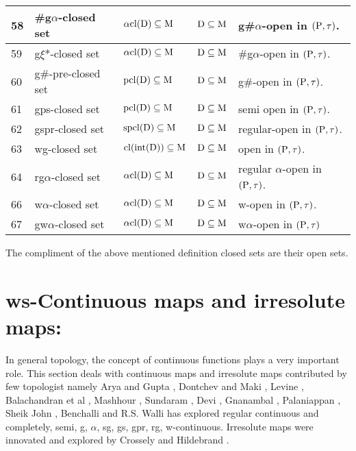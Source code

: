 {\begin{longtable}{|p{1cm}|>{\raggedright}p{5cm}|>{\centering}p{2.5cm}|>{\centering}p{1.7cm}|>{\centering}p{2.8cm}|}
\hline
58 & \#g$\alpha$-closed set\cite{key17} & $\alpha\mathrm{cl}(\mathrm{D}) \subseteq \mathrm{M}$ & $\mathrm{D} \subseteq \mathrm{M}$ & g\#$\alpha$-open in $(\mathrm{P}, \tau)$.\tabularnewline
\hline
59 & g$\xi$*-closed set\cite{key33} & $\alpha\mathrm{cl}(\mathrm{D}) \subseteq \mathrm{M}$ & $\mathrm{D} \subseteq \mathrm{M}$ & \#g$\alpha$-open in $(\mathrm{P}, \tau)$.\tabularnewline
\hline
60 & g\#-pre-closed set\cite{key51} & $\mathrm{pcl}(\mathrm{D}) \subseteq \mathrm{M}$ & $\mathrm{D} \subseteq \mathrm{M}$ & g\#-open in $(\mathrm{P}, \tau)$.\tabularnewline
\hline
61 & gps-closed set\cite{key53} & $\mathrm{pcl}(\mathrm{D}) \subseteq \mathrm{M}$ & $\mathrm{D} \subseteq \mathrm{M}$ & semi open in $(\mathrm{P}, \tau)$.\tabularnewline
\hline
62 & gspr-closed set\cite{key25} & $\mathrm{spcl}(\mathrm{D}) \subseteq \mathrm{M}$ & $\mathrm{D} \subseteq \mathrm{M}$ & regular-open in $(\mathrm{P}, \tau)$.\tabularnewline
\hline
63 & wg-closed set\cite{key42} & $\mathrm{cl}(\mbox{int}(\mathrm{D})) \subseteq \mathrm{M}$ & $\mathrm{D} \subseteq \mathrm{M}$ & open in $(\mathrm{P}, \tau)$.\tabularnewline
\hline
64 & rg$\alpha$-closed set\cite{key63} & $\alpha\mathrm{cl}(\mathrm{D}) \subseteq \mathrm{M}$ & $\mathrm{D} \subseteq \mathrm{M}$ & regular $\alpha$-open in $(\mathrm{P}, \tau)$.\tabularnewline
\hline
66 & w$\alpha$-closed set\cite{key11} & $\alpha\mathrm{cl}(\mathrm{D}) \subseteq \mathrm{M}$ & $\mathrm{D} \subseteq \mathrm{M}$ & w-open in $(\mathrm{P}, \tau)$.\tabularnewline
\hline
67 & gw$\alpha$-closed set\cite{key12} & $\alpha\mathrm{cl}(\mathrm{D}) \subseteq \mathrm{M}$ & $\mathrm{D} \subseteq \mathrm{M}$ & w$\alpha$-open in $(\mathrm{P}, \tau)$\tabularnewline
\hline
\end{longtable}}

The compliment of the above mentioned definition closed sets are their open sets. 

\section{ws-Continuous maps and irresolute maps:}

In general topology, the concept of continuous functions plays a very important role. This section deals with continuous maps and irresolute maps contributed by few topologist namely Arya and Gupta \cite{key6}, Dontchev and Maki \cite{key31}, Levine \cite{key49}, Balachandran et al \cite{key13}, Mashhour \cite{key60}, Sundaram \cite{key90}, Devi \cite{key22}, Gnanambal \cite{key41}, Palaniappan \cite{key72}, Sheik John \cite{key84}, Benchalli \cite{key} and R.S. Walli \cite{key} has explored regular continuous and completely, semi, g, $\alpha$, sg, gs, gpr, rg, w-continuous. Irresolute maps were innovated and explored by Crossely and Hildebrand \cite{key20} .

